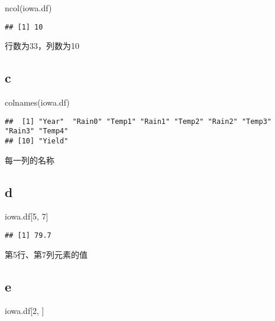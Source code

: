 \documentclass[
]{article}
\newenvironment{Shaded}{\begin{snugshade}}{\end{snugshade}}
\newcommand{\DecValTok}[1]{\textcolor[rgb]{0.00,0.00,0.81}{#1}}
\newcommand{\FunctionTok}[1]{\textcolor[rgb]{0.00,0.00,0.00}{#1}}
\newcommand{\NormalTok}[1]{#1}
\begin{document}
\begin{Shaded}
\begin{Highlighting}[]
\FunctionTok{ncol}\NormalTok{(iowa.df)}
\end{Highlighting}
\end{Shaded}

\begin{verbatim}
## [1] 10
\end{verbatim}

行数为33，列数为10

\hypertarget{c}{%
\subsection{c}\label{c}}

\begin{Shaded}
\begin{Highlighting}[]
\FunctionTok{colnames}\NormalTok{(iowa.df)}
\end{Highlighting}
\end{Shaded}

\begin{verbatim}
##  [1] "Year"  "Rain0" "Temp1" "Rain1" "Temp2" "Rain2" "Temp3" "Rain3" "Temp4"
## [10] "Yield"
\end{verbatim}

每一列的名称

\hypertarget{d}{%
\subsection{d}\label{d}}

\begin{Shaded}
\begin{Highlighting}[]
\NormalTok{iowa.df[}\DecValTok{5}\NormalTok{, }\DecValTok{7}\NormalTok{]}
\end{Highlighting}
\end{Shaded}

\begin{verbatim}
## [1] 79.7
\end{verbatim}

第5行、第7列元素的值

\hypertarget{e}{%
\subsection{e}\label{e}}

\begin{Shaded}
\begin{Highlighting}[]
\NormalTok{iowa.df[}\DecValTok{2}\NormalTok{, ]}
\end{Highlighting}
\end{Shaded}
\end{document}
